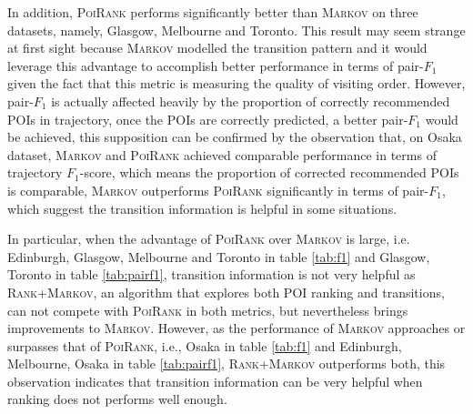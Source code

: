 In addition, \textsc{PoiRank} performs significantly better than \textsc{Markov} on three datasets, namely,
Glasgow, Melbourne and Toronto.
%
This result may seem strange at first sight because \textsc{Markov} modelled the transition pattern and it would leverage
this advantage to accomplish better performance in terms of pair-$F_1$ given the fact that this metric is measuring the quality
of visiting order.
However, pair-$F_1$ is actually affected heavily by the proportion of correctly recommended POIs in trajectory,
once the POIs are correctly predicted, a better pair-$F_1$ would be achieved,
this supposition can be confirmed by the observation that, on Osaka dataset, \textsc{Markov} and \textsc{PoiRank} achieved
comparable performance in terms of trajectory $F_1$-score, which means the proportion of corrected recommended POIs is comparable,
\textsc{Markov} outperforms \textsc{PoiRank} significantly in terms of pair-$F_1$,
which suggest the transition information is helpful in some situations.

In particular, when the advantage of \textsc{PoiRank} over \textsc{Markov} is large,
i.e. Edinburgh, Glasgow, Melbourne and Toronto in table \ref{tab:f1} and Glasgow, Toronto in table \ref{tab:pairf1},
transition information is not very helpful as \textsc{Rank+Markov}, an algorithm that explores both POI ranking and transitions,
can not compete with \textsc{PoiRank} in both metrics, but nevertheless brings improvements to \textsc{Markov}.
However, as the performance of \textsc{Markov} approaches or surpasses that of \textsc{PoiRank},
i.e., Osaka in table \ref{tab:f1} and Edinburgh, Melbourne, Osaka in table \ref{tab:pairf1},
\textsc{Rank+Markov} outperforms both, this observation indicates that transition information can be very helpful when
ranking does not performs well enough.

